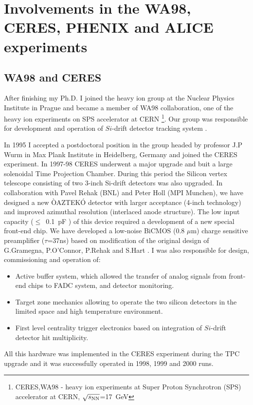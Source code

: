 \documentclass[12pt]{article}
\begin{document}
\section{Involvements in the WA98, CERES, PHENIX  and ALICE experiments}

\subsection{WA98 and CERES}

After finishing my Ph.D. I joined the heavy ion group at the Nuclear Physics Institute in Prague and became a member of WA98 collaboration, one of the heavy ion experiments on SPS accelerator at CERN
\footnote{CERES,WA98 - heavy ion experiments at Super Proton Synchrotron (SPS) accelerator at CERN, $\sqrt{s_{\rm NN}}$=17~GeV}. Our group was responsible for development and operation of  $Si$-drift detector tracking system \cite{Gatti:1984uu}. 

In 1995 I accepted a postdoctoral position in the group headed by professor J.P Wurm in Max Plank Institute in Heidelberg, Germany and joined the CERES experiment. In 1997-98  CERES  underwent a major upgrade and buit a large solenoidal Time Projection Chamber. During this period the Silicon vertex telescope consisting of two 3-inch Si-drift detectors was also upgraded. In collaboration with Pavel Rehak (BNL) and Peter Holl (MPI Munchen), we have designed a new ÒAZTEKÓ detector with larger acceptance (4-inch technology) and improved azimuthal resolution (interlaced anode structure).  The low input capacity ($\leq$~0.1~pF ) of this device required a development of  a new special front-end chip. We have developed a low-noise BiCMOS (0.8 $\mu$m) charge sensitive preamplifier ($\tau$=37ns) based on modification of the original design of  G.Gramegna, P.O'Connor, P.Rehak and S.Hart \cite{O'Connor:1998xv}.  I was also responsible for design, commissioning and operation of: 
\begin{itemize}
\item Active buffer system, which allowed the transfer of  analog signals from front-end chips to FADC system, and detector monitoring.   
\item Target zone mechanics allowing to operate the two silicon detectors in the limited space and high temperature environment.
\item First level centrality trigger electronics based on integration of $Si$-drift detector hit multiplicity.
\end{itemize}
All this hardware was implemented in the CERES experiment during the TPC upgrade and it was successfully operated in  1998, 1999 and 2000 runs.
\end{document}
